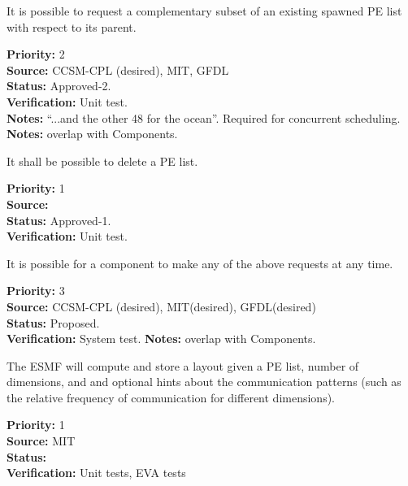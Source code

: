 
It is possible to request a complementary subset of an existing spawned
PE list with respect to its parent.

\begin{reqlist}
{\bf Priority:}  2 \\
{\bf Source:}  CCSM-CPL (desired), MIT, GFDL \\
{\bf Status:} Approved-2. \\
{\bf Verification:} Unit test.\\ 
{\bf Notes:}  ``...and the other 48 for the ocean''.
  Required for concurrent scheduling.
{\bf Notes:} overlap with Components.
\end{reqlist}

It shall be possible to delete a PE list.

\begin{reqlist}
{\bf Priority:} 1 \\
{\bf Source:}  \\
{\bf Status:} Approved-1. \\
{\bf Verification:} Unit test.\\ 
\end{reqlist}


It is possible for a component to make any of the above requests at
any time.

\begin{reqlist}
{\bf Priority:} 3 \\
{\bf Source:}  CCSM-CPL (desired), MIT(desired), GFDL(desired) \\
{\bf Status:} Proposed. \\
{\bf Verification:} System test.
{\bf Notes:} overlap with Components.
\end{reqlist}


The ESMF will compute and store a layout given a PE list, number of dimensions, 
and and optional hints about the communication patterns (such as the 
relative frequency of communication for different dimensions).
\begin{reqlist}
  {\bf Priority:} 1 \\
  {\bf Source:}  MIT \\
  {\bf Status:}  \\
  {\bf Verification:} Unit tests, EVA tests \\
\end{reqlist}

